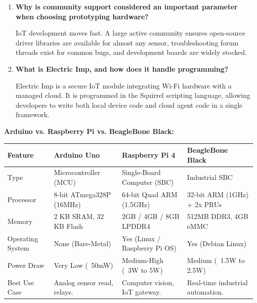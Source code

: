 \documentclass[12pt,a4paper]{article}
\newcommand{\Q}[1]{\textbf{#1}\par\noindent\ignorespaces}
\renewcommand{\arraystretch}{1.45}
\begin{document}
\begin{tcolorbox}[exambox, title={\textbf{Frequently Asked / Viva Questions}}]
\begin{enumerate}[leftmargin=*, topsep=0pt, label=\textbf{Q\arabic*.}, itemsep=6pt]
  \item \Q{Why is community support considered an important parameter when choosing prototyping hardware?}
        IoT development moves fast. A large active community ensures open-source driver libraries are available for almost any sensor, troubleshooting forum threads exist for common bugs, and development boards are widely stocked.
        
  \item \Q{What is Electric Imp, and how does it handle programming?}
        Electric Imp is a secure IoT module integrating Wi-Fi hardware with a managed cloud. It is programmed in the Squirrel scripting language, allowing developers to write both local device code and cloud agent code in a single framework.
\end{enumerate}
\end{tcolorbox}

\vspace{6pt}

\begin{tcolorbox}[tikzbox, title={\textbf{Comparison Snapshot}}]
\textbf{Arduino vs. Raspberry Pi vs. BeagleBone Black:}\par\vspace{6pt}\noindent
{\renewcommand{\arraystretch}{1.35}%
\begin{tabularx}{\linewidth}{|B{3.2cm}|Y|Y|Y|}
\hline
\textbf{Feature} & \textbf{Arduino Uno} & \textbf{Raspberry Pi 4} & \textbf{BeagleBone Black} \\
\hline
Type & Microcontroller (MCU) & Single-Board Computer (SBC) & Industrial SBC \\
\hline
Processor & 8-bit ATmega328P (16MHz) & 64-bit Quad ARM (1.5GHz) & 32-bit ARM (1GHz) + 2x PRUs \\
\hline
Memory & 2 KB SRAM, 32 KB Flash & 2GB / 4GB / 8GB LPDDR4 & 512MB DDR3, 4GB eMMC \\
\hline
Operating System & None (Bare-Metal) & Yes (Linux / Raspberry Pi OS) & Yes (Debian Linux) \\
\hline
Power Draw & Very Low (~50mW) & Medium-High (~3W to 5W) & Medium (~1.5W to 2.5W) \\
\hline
Best Use Case & Analog sensor read, relays. & Computer vision, IoT gateway. & Real-time industrial automation. \\
\hline
\end{tabularx}}
\end{tcolorbox}
\end{document}
